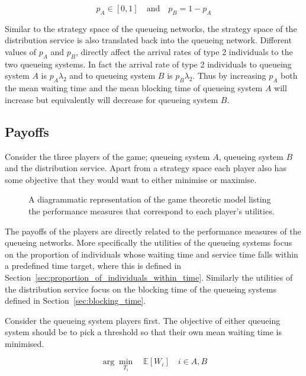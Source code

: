 \begin{equation}\label{eq:game_strategy_space_distribution_service_simplified}
    p_A \in [0, 1] \quad \text{and} \quad p_B = 1 - p_A
\end{equation}

Similar to the strategy space of the queueing networks, the strategy space of
the distribution service is also translated back into the queueing network.
Different values of \(p_A\) and \(p_B\), directly affect the arrival rates of
type 2 individuals to the two queueing systems.
In fact the arrival rate of type 2 individuals to queueing system \(A\) is
\(p_A \lambda_2\) and to queueing system \(B\) is \(p_B \lambda_2\).
Thus by increasing \(p_A\) both the mean waiting time and the mean blocking time
of queueing system \(A\) will increase but equivalently will decrease for
queueing system \(B\).


\subsection{Payoffs}

Consider the three players of the game; queueing system \(A\), queueing system
\(B\) and
the distribution service.
Apart from a strategy space each player also has some objective that they would
want to either minimise or maximise.

\begin{figure}[H]
    
    \caption{A diagrammatic representation of the game theoretic model listing
    the performance measures that correspond to each player's utilities.}
    \label{fig:diagram_of_game_theoretic_model_objectives}
\end{figure}


The payoffs of the players are directly related to the performance measures of
the queueing networks.
More specifically the utilities of the queueing systems focus on the proportion
of individuals whose waiting time and service time falls within a predefined
time target, where this is defined in
Section~\ref{sec:proportion_of_individuals_within_time}.
Similarly the utilities of the distribution service focus on the blocking time
of the queueing systems defined in Section~\ref{sec:blocking_time}.

Consider the queueing system players first.
The objective of either queueing system should be to pick a threshold so that
their own mean waiting time is minimised.

\begin{equation}\label{eq:game_theoretic_alternative_objective_queueing_system_A}
    \arg \min_{T_i} \quad \mathbb{E}[W_i] \quad i \in {A, B}
\end{equation}

